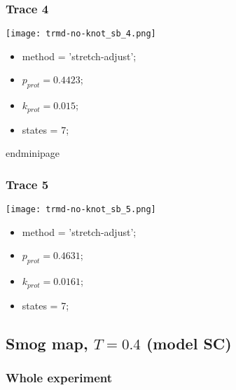 \begin{minipage}[c]{0.45\textwidth}
\begin{minipage}[c]{0.45\textwidth}
\begin{minipage}[c]{0.45\textwidth}
\begin{minipage}[c]{0.45\textwidth}
\begin{minipage}[c]{0.45\textwidth}
\begin{minipage}[c]{0.45\textwidth}
\begin{minipage}[c]{0.45\textwidth}
\begin{minipage}[c]{0.45\textwidth}
\begin{minipage}[c]{0.45\textwidth}
\subsubsection{Trace 4}
\begin{minipage}[c]{0.7\textwidth}
    \texttt{[image: trmd-no-knot\_sb\_4.png]}
\end{minipage}
\hfill
\begin{minipage}[c]{0.45\textwidth}
    \begin{itemize}
        \item method = 'stretch-adjust';
        \item $p_{prot}=0.4423$;
        \item $k_{prot}=0.015$;
        \item states = 7;
    \end{itemize}
end{minipage}

\subsubsection{Trace 5}
\begin{minipage}[c]{0.7\textwidth}
    \texttt{[image: trmd-no-knot\_sb\_5.png]}
\end{minipage}
\hfill
\begin{minipage}[c]{0.45\textwidth}
    \begin{itemize}
        \item method = 'stretch-adjust';
        \item $p_{prot}=0.4631$;
        \item $k_{prot}=0.0161$;
        \item states = 7;
    \end{itemize}
\end{minipage}

\subsection{Smog map, $T=0.4$ (model SC)}
\subsubsection{Whole experiment}


\end{minipage}
\end{minipage}
\end{minipage}
\end{minipage}
\end{minipage}
\end{minipage}
\end{minipage}
\end{minipage}
\end{minipage}
\end{minipage}
